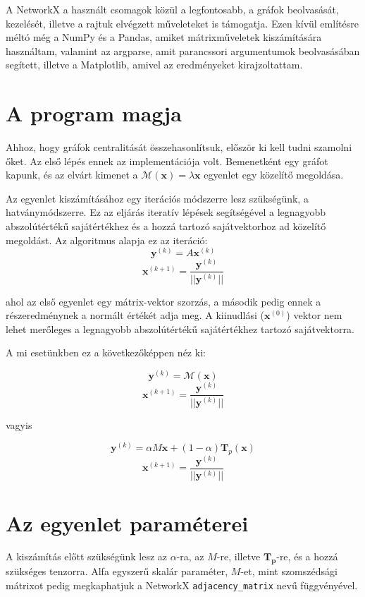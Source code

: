 \documentclass[12pt,numbers=noenddot]{report}
\begin{document}
A NetworkX a használt csomagok közül a legfontosabb, a gráfok beolvasását,
kezelését, illetve a rajtuk elvégzett műveleteket is támogatja. Ezen kívül
említésre méltó még a NumPy és a Pandas, amiket mátrixműveletek kiszámítására
használtam, valamint az argparse, amit parancssori argumentumok beolvasásában 
segített, illetve a Matplotlib, amivel az eredményeket kirajzoltattam.

\section{A program magja}

Ahhoz, hogy gráfok centralitását összehasonlítsuk, először ki kell tudni szamolni őket.
Az első lépés ennek az implementációja volt. Bemenetként egy gráfot kapunk, és az elvárt kimenet a 
$\mathcal{M}(\boldsymbol{x}) = \lambda \boldsymbol{x}$
egyenlet egy közelítő megoldása. 

Az egyenlet kiszámításához egy iterációs módszerre lesz szükségünk, a hatványmódszerre.
Ez az eljárás iteratív lépések segítségével a legnagyobb abszolútértékű sajátértékhez
és a hozzá tartozó sajátvektorhoz ad közelítő megoldást. 
Az algoritmus alapja ez az iteráció:
$$\boldsymbol{y}^{(k)} = A \boldsymbol{x}^{(k)}$$
$$\boldsymbol{x}^{(k+1)} = \frac{\boldsymbol{y}^{(k)}}{||\boldsymbol{y}^{(k)}||}$$

ahol az első egyenlet egy mátrix-vektor szorzás, a második pedig ennek a részeredménynek a normált értékét adja meg.
A kiinudlási ($\boldsymbol{x}^{(0)}$) vektor nem lehet merőleges a legnagyobb abszolútértékű sajátértékhez tartozó sajátvektorra.

\pagebreak

A mi esetünkben ez a következőképpen néz ki:

$$\boldsymbol{y}^{(k)} = \mathcal{M}(\boldsymbol{x})$$
$$\boldsymbol{x}^{(k+1)} = \frac{\boldsymbol{y}^{(k)}}{||\boldsymbol{y}^{(k)}||}$$

vagyis

$$\boldsymbol{y}^{(k)} = \alpha M \boldsymbol{x} + (1-\alpha) \boldsymbol{T}_p(\boldsymbol{x})$$
$$\boldsymbol{x}^{(k+1)} = \frac{\boldsymbol{y}^{(k)}}{||\boldsymbol{y}^{(k)}||}$$


\section{Az egyenlet paraméterei}

A kiszámítás előtt szükségünk lesz az $\alpha$-ra, az $M$-re, illetve $\boldsymbol{T_p}$-re, és a hozzá szükséges tenzorra.
Alfa egyszerű skalár paraméter, $M$-et, mint szomszédsági mátrixot pedig megkaphatjuk 
a NetworkX \texttt{adjacency\_matrix} nevű függvényével.
\end{document}
